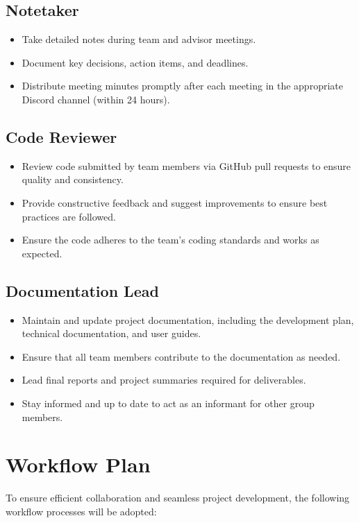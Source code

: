 \documentclass{article}
\begin{document}
\subsection{Notetaker}
  \begin{itemize}
    \item Take detailed notes during team and advisor meetings.
    \item Document key decisions, action items, and deadlines.
    \item Distribute meeting minutes promptly after each meeting in the appropriate Discord channel (within 24 hours).
  \end{itemize}

  \subsection{Code Reviewer}
  \begin{itemize}
    \item Review code submitted by team members via GitHub pull requests to ensure quality and consistency.
    \item Provide constructive feedback and suggest improvements to ensure best practices are followed.
    \item Ensure the code adheres to the team's coding standards and works as expected.
  \end{itemize}

\subsection{Documentation Lead}
  \begin{itemize}
    \item Maintain and update project documentation, including the development plan, technical documentation, and user guides.
    \item Ensure that all team members contribute to the documentation as needed.
    \item Lead final reports and project summaries required for deliverables.
    \item Stay informed and up to date to act as an informant for other group members.
  \end{itemize}
  

\section{Workflow Plan}

To ensure efficient collaboration and seamless project development, the following workflow processes will be adopted:
\end{document}
